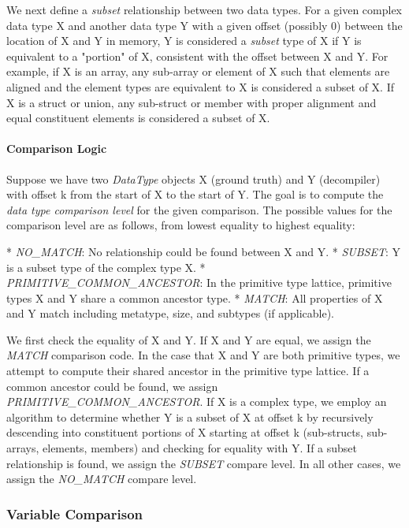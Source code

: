 \documentclass[conference]{IEEEtran}
\begin{document}
We next define a \emph{subset} relationship between two data types. For a given complex data type X and another data type Y with a given offset (possibly 0) between the location of X and Y in memory, Y is considered a \emph{subset} type of X if Y is equivalent to a "portion" of X, consistent with the offset between X and Y. For example, if X is an array, any sub-array or element of X such that elements are aligned and the element types are equivalent to X is considered a subset of X. If X is a struct or union, any sub-struct or member with proper alignment and equal constituent elements is considered a subset of X.

\paragraph{Comparison Logic}

Suppose we have two \emph{DataType} objects X (ground truth) and Y (decompiler) with offset k from the start of X to the start of Y. The goal is to compute the \emph{data type comparison level} for the given comparison. The possible values for the comparison level are as follows, from lowest equality to highest equality:

* \emph{NO\_MATCH}: No relationship could be found between X and Y.
* \emph{SUBSET}: Y is a subset type of the complex type X.
* \emph{PRIMITIVE\_COMMON\_ANCESTOR}: In the primitive type lattice, primitive types X and Y share a common ancestor type.
* \emph{MATCH}: All properties of X and Y match including metatype, size, and subtypes (if applicable).

We first check the equality of X and Y. If X and Y are equal, we assign the \emph{MATCH} comparison code. In the case that X and Y are both primitive types, we attempt to compute their shared ancestor in the primitive type lattice. If a common ancestor could be found, we assign \emph{PRIMITIVE\_COMMON\_ANCESTOR}. If X is a complex type, we employ an algorithm to determine whether Y is a subset of X at offset k by recursively descending into constituent portions of X starting at offset k (sub-structs, sub-arrays, elements, members) and checking for equality with Y. If a subset relationship is found, we assign the \emph{SUBSET} compare level. In all other cases, we assign the \emph{NO\_MATCH} compare level.

\subsubsection{Variable Comparison}
\end{document}
